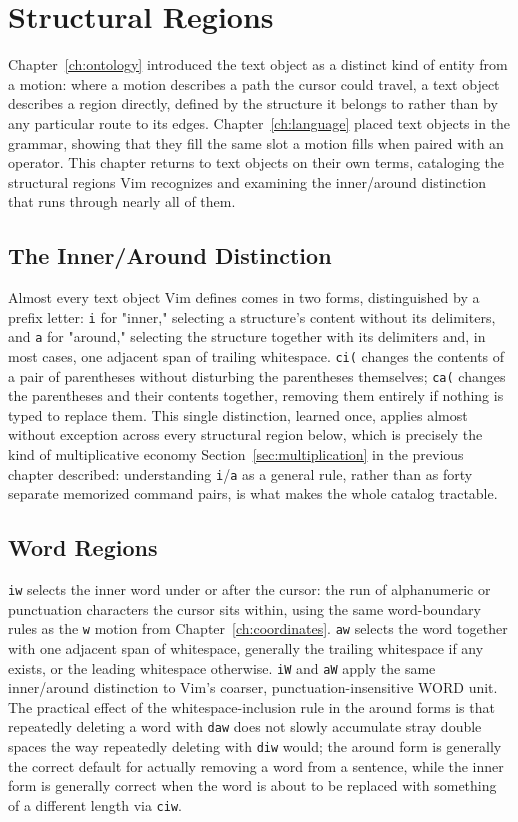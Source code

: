 \chapter{Structural Regions}
\label{ch:regions}

Chapter~\ref{ch:ontology} introduced the text object as a distinct kind of entity from a motion: where a motion describes a path the cursor could travel, a text object describes a region directly, defined by the structure it belongs to rather than by any particular route to its edges. Chapter~\ref{ch:language} placed text objects in the grammar, showing that they fill the same slot a motion fills when paired with an operator. This chapter returns to text objects on their own terms, cataloging the structural regions Vim recognizes and examining the inner/around distinction that runs through nearly all of them.

\section{The Inner/Around Distinction}

Almost every text object Vim defines comes in two forms, distinguished by a prefix letter: \texttt{i} for "inner," selecting a structure's content without its delimiters, and \texttt{a} for "around," selecting the structure together with its delimiters and, in most cases, one adjacent span of trailing whitespace. \texttt{ci(} changes the contents of a pair of parentheses without disturbing the parentheses themselves; \texttt{ca(} changes the parentheses and their contents together, removing them entirely if nothing is typed to replace them. This single distinction, learned once, applies almost without exception across every structural region below, which is precisely the kind of multiplicative economy Section~\ref{sec:multiplication} in the previous chapter described: understanding \texttt{i}/\texttt{a} as a general rule, rather than as forty separate memorized command pairs, is what makes the whole catalog tractable.

\section{Word Regions}

\texttt{iw} selects the inner word under or after the cursor: the run of alphanumeric or punctuation characters the cursor sits within, using the same word-boundary rules as the \texttt{w} motion from Chapter~\ref{ch:coordinates}. \texttt{aw} selects the word together with one adjacent span of whitespace, generally the trailing whitespace if any exists, or the leading whitespace otherwise. \texttt{iW} and \texttt{aW} apply the same inner/around distinction to Vim's coarser, punctuation-insensitive WORD unit. The practical effect of the whitespace-inclusion rule in the around forms is that repeatedly deleting a word with \texttt{daw} does not slowly accumulate stray double spaces the way repeatedly deleting with \texttt{diw} would; the around form is generally the correct default for actually removing a word from a sentence, while the inner form is generally correct when the word is about to be replaced with something of a different length via \texttt{ciw}.

